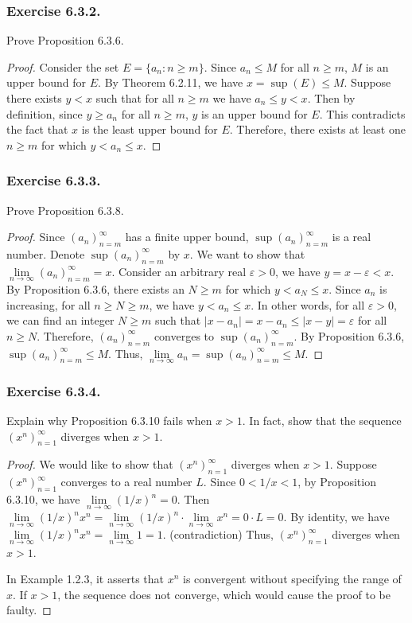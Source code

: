 \documentclass[12pt, letter]{article}
\newcommand{\an}{(a_n)_{n=m}^\infty}
\begin{document}
\subsubsection*{Exercise 6.3.2.}
Prove Proposition 6.3.6.
\begin{proof}
    Consider the set $E=\{a_n:n\geq m\}$. Since $a_n\leq M$ for all $n\geq m$, $M$ is an upper bound for $E$. By Theorem 6.2.11, we have $x=\sup(E)\leq M$. 
    Suppose there exists $y<x$ such that for all $n\geq m$ we have $a_n\leq y<x$. Then by definition, since $y\geq a_n$ for all $n\geq m$, $y$ is an upper bound for $E$.
    This contradicts the fact that $x$ is the least upper bound for $E$. Therefore, there exists at least one $n\geq m$ for which $y<a_n\leq x$.
\end{proof}
\subsubsection*{Exercise 6.3.3.}
Prove Proposition 6.3.8.
\begin{proof}
    Since $\an$ has a finite upper bound, $\sup\an$ is a real number. Denote $\sup\an$ by $x$. We want to show that $\lim\limits_{n\to\infty}\an=x$. Consider an arbitrary real $\varepsilon>0$,
    we have $y=x-\varepsilon<x$. By Proposition 6.3.6, there exists an $N\geq m$ for which $y<a_N\leq x$. Since $a_n$ is increasing, for all $n\geq N\geq m$, we have $y<a_n\leq x$.
    In other words, for all $\varepsilon>0$, we can find an integer $N\geq m$ such that $|x-a_n|=x-a_n\leq |x-y|=\varepsilon$ for all $n\geq N$. Therefore, $\an$ converges to $\sup\an$. 
    By Proposition 6.3.6, $\sup\an\leq M$. Thus, $\lim\limits_{n\to\infty}a_n=\sup\an\leq M$.
\end{proof}
\subsubsection*{Exercise 6.3.4.}
Explain why Proposition 6.3.10 fails when $x>1$. In fact, show that the sequence $(x^n)_{n=1}^\infty$ diverges when $x>1$.
\begin{proof}
    We would like to show that $(x^n)_{n=1}^\infty$ diverges when $x>1$. Suppose $(x^n)_{n=1}^\infty$ converges to a real number $L$. Since $0<1/x<1$, by Proposition 6.3.10, we have $\lim\limits_{n\to\infty}(1/x)^n=0$.
    Then $\lim\limits_{n\to\infty}(1/x)^n x^n=\lim\limits_{n\to\infty}(1/x)^n\cdot \lim\limits_{n\to\infty}x^n=0\cdot L=0$. By identity, we have $\lim\limits_{n\to\infty}(1/x)^n x^n=\lim\limits_{n\to\infty}1=1$. (contradiction)
    Thus, $(x^n)_{n=1}^\infty$ diverges when $x>1$.

    In Example 1.2.3, it asserts that $x^n$ is convergent without specifying the range of $x$. If $x>1$, the sequence does not converge, which would cause the proof to be faulty.
\end{proof}
\end{document}
